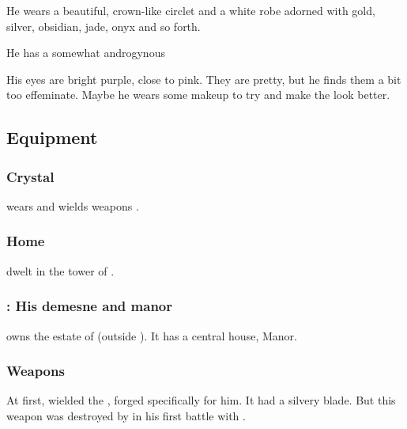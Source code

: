 He wears a beautiful, crown-like circlet and a white robe adorned with gold, silver, obsidian, jade, onyx and so forth. 

He has a somewhat androgynous 

His eyes are bright purple, close to pink. 
They are pretty, but he finds them a bit too effeminate. 
Maybe he wears some makeup to try and make the \colour look better. 









\subsection{Equipment}




\subsubsection{Crystal \armour}
\Teshrial{} wears \armour and wields weapons . 





\subsubsection{Home}
\Teshrial dwelt in the tower of . 





\subsubsection{\Ruishagh: His demesne and manor}
\index{\Ruishagh}
\Teshrial{} owns the estate of \Ruishagh (outside \Nyx). 
It has a central house, \Ruishagh{} Manor. 





\subsubsection{Weapons}
\index{\Turishah}
At first, \Teshrial{} wielded the  \Turishah, forged specifically for him. 
It had a silvery blade. 
But this weapon was destroyed by \QuessanthIshnaruchaefir{} in his first battle with \Teshrial. 

